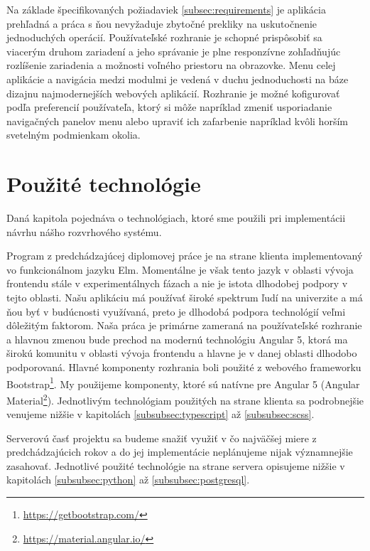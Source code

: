 Na základe špecifikovaných požiadaviek \ref{subsec:requirements} je aplikácia prehľadná
a práca s ňou nevyžaduje zbytočné prekliky na uskutočnenie jednoduchých operácií. 
Používateľské rozhranie je schopné prispôsobiť sa viacerým druhom zariadení a jeho správanie
je plne responzívne zohľadňujúc rozlíšenie zariadenia a možnosti voľného priestoru na obrazovke.
Menu celej aplikácie a navigácia medzi modulmi je vedená v duchu jednoduchosti na báze
dizajnu najmodernejších webových aplikácií. Rozhranie je možné kofigurovať podľa preferencií
používateľa, ktorý si môže napríklad zmeniť usporiadanie navigačných panelov menu
alebo upraviť ich zafarbenie napríklad kvôli horším svetelným podmienkam okolia.
\section{Použité technológie}
\label{sec:used_technologies}

Daná kapitola pojednáva o technológiach, ktoré sme použili pri implementácii návrhu nášho
rozvrhového systému.

Program z predchádzajúcej diplomovej práce \cite{racak} je na strane klienta implementovaný vo
funkcionálnom jazyku Elm.
Momentálne je však tento jazyk v oblasti vývoja frontendu
stále v experimentálnych fázach a nie je istota dlhodobej podpory v tejto oblasti. Našu
aplikáciu má používať široké spektrum ľudí na univerzite a má ňou byť v budúcnosti využívaná,
preto je dlhodobá podpora technológií veľmi dôležitým faktorom. Naša práca je primárne
zameraná na používateľské rozhranie a hlavnou zmenou bude prechod na modernú technológiu
Angular 5, ktorá ma širokú komunitu v oblasti vývoja frontendu a hlavne je v danej oblasti
dlhodobo podporovaná. Hlavné komponenty rozhrania boli použité z webového frameworku
Bootstrap\footnote{\url{https://getbootstrap.com/}}. My použijeme komponenty, ktoré sú natívne pre Angular 5
(Angular Material\footnote{\url{https://material.angular.io/}}).
Jednotlivým technológiam použitých na strane klienta sa podrobnejšie venujeme nižšie v kapitolách
\ref{subsubsec:typescript} až \ref{subsubsec:scss}.

Serverovú časť projektu sa budeme snažiť využiť v čo najväčšej miere z predchádzajúcich
rokov a do jej implementácie neplánujeme nijak významnejšie zasahovať. Jednotlivé
použité technológie na strane servera opisujeme nižšie v kapitolách 
\ref{subsubsec:python} až \ref{subsubsec:postgresql}.

